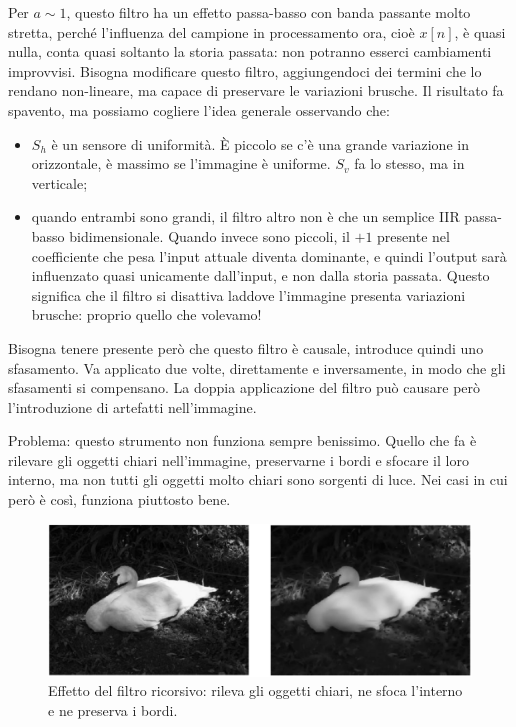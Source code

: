 \documentclass[a4paper,11pt]{article}
\begin{document}
Per $a \sim 1$, questo filtro ha un effetto passa-basso con banda passante molto stretta, perché l'influenza del campione in processamento ora, cioè $x[n]$, è
quasi nulla, conta quasi soltanto la storia passata: non potranno esserci cambiamenti improvvisi.
Bisogna modificare questo filtro, aggiungendoci dei termini che lo rendano non-lineare, ma capace di preservare le variazioni brusche.
Il risultato fa spavento, ma possiamo cogliere l'idea generale osservando che:
\begin{itemize}
    \item $S_h$ è un sensore di uniformità. È piccolo se c'è una grande variazione in orizzontale, è massimo se l'immagine è uniforme. $S_v$ fa lo
    stesso, ma in verticale;
    \item quando entrambi sono grandi, il filtro altro non è che un semplice IIR passa-basso bidimensionale. Quando invece sono piccoli, il $+1$ presente nel
    coefficiente che pesa l'input attuale diventa dominante, e quindi l'output sarà influenzato quasi unicamente dall'input, e non dalla storia passata.
    Questo significa che il filtro si disattiva laddove l'immagine presenta variazioni brusche: proprio quello che volevamo!
\end{itemize}
Bisogna tenere presente però che questo filtro è causale, introduce quindi uno sfasamento. Va applicato due volte, direttamente e inversamente, in modo che
gli sfasamenti si compensano. La doppia applicazione del filtro può causare però l'introduzione di artefatti nell'immagine.
\par
Problema: questo strumento non funziona sempre benissimo. Quello che fa è rilevare gli oggetti chiari nell'immagine, preservarne i bordi e sfocare il
loro interno, ma non tutti gli oggetti molto chiari sono sorgenti di luce. Nei casi in cui però è così, funziona piuttosto bene.

\renewcommand{\thefigure}{5.29}
\begin{figure}[!h]
  \centering
    \includegraphics[scale=0.4]{images/5/recursive_effect.png}
    \caption{Effetto del filtro ricorsivo: rileva gli oggetti chiari, ne sfoca l'interno e ne preserva i bordi.}
\end{figure}
\end{document}
